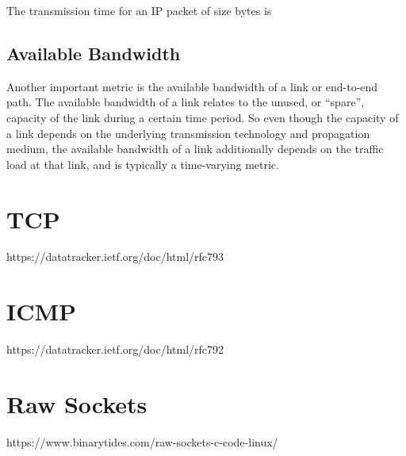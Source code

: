 The transmission time for an IP packet of size bytes is

\subsection*{Available Bandwidth}
Another important metric is the available bandwidth of a link or end-to-end path. The available bandwidth of a link relates to the unused, or “spare”, capacity of the link during a certain time period. So even though the capacity of a link depends on the underlying transmission technology and propagation medium, the available bandwidth of a link additionally depends on the traffic load at that link, and is typically a time-varying metric.

\section{TCP}
https://datatracker.ietf.org/doc/html/rfc793

\section{ICMP}
https://datatracker.ietf.org/doc/html/rfc792

\section{Raw Sockets}
https://www.binarytides.com/raw-sockets-c-code-linux/


